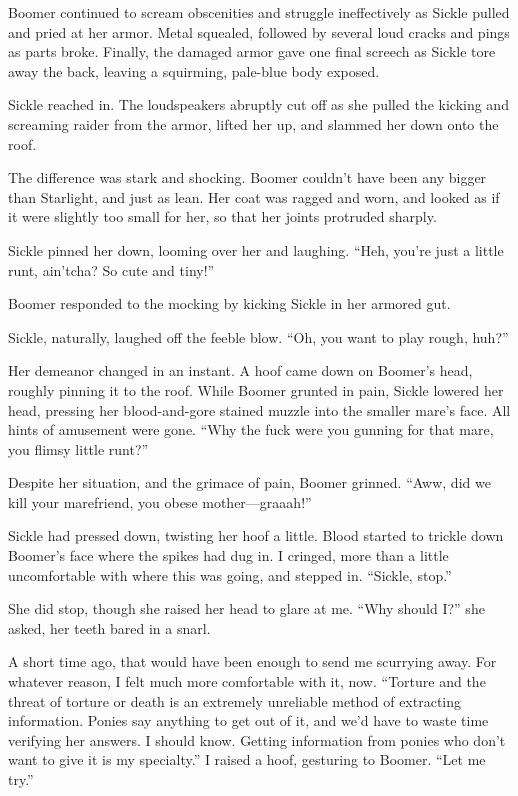 Boomer continued to scream obscenities and struggle ineffectively as Sickle pulled and pried at her armor. Metal squealed, followed by several loud cracks and pings as parts broke. Finally, the damaged armor gave one final screech as Sickle tore away the back, leaving a squirming, pale-blue body exposed.

Sickle reached in. The loudspeakers abruptly cut off as she pulled the kicking and screaming raider from the armor, lifted her up, and slammed her down onto the roof.

The difference was stark and shocking. Boomer couldn’t have been any bigger than Starlight, and just as lean. Her coat was ragged and worn, and looked as if it were slightly too small for her, so that her joints protruded sharply.

Sickle pinned her down, looming over her and laughing. “Heh, you’re just a little runt, ain’tcha? So cute and tiny!”

Boomer responded to the mocking by kicking Sickle in her armored gut.

Sickle, naturally, laughed off the feeble blow. “Oh, you want to play rough, huh?”

Her demeanor changed in an instant. A hoof came down on Boomer’s head, roughly pinning it to the roof. While Boomer grunted in pain, Sickle lowered her head, pressing her blood-and-gore stained muzzle into the smaller mare’s face. All hints of amusement were gone. “Why the fuck were you gunning for that mare, you flimsy little runt?”

Despite her situation, and the grimace of pain, Boomer grinned. “Aww, did we kill your marefriend, you obese mother—graaah!”

Sickle had pressed down, twisting her hoof a little. Blood started to trickle down Boomer’s face where the spikes had dug in. I cringed, more than a little uncomfortable with where this was going, and stepped in. “Sickle, stop.”

She did stop, though she raised her head to glare at me. “Why should I?” she asked, her teeth bared in a snarl.

A short time ago, that would have been enough to send me scurrying away. For whatever reason, I felt much more comfortable with it, now. “Torture and the threat of torture or death is an extremely unreliable method of extracting information. Ponies say anything to get out of it, and we’d have to waste time verifying her answers. I should know. Getting information from ponies who don’t want to give it is my specialty.” I raised a hoof, gesturing to Boomer. “Let me try.”

